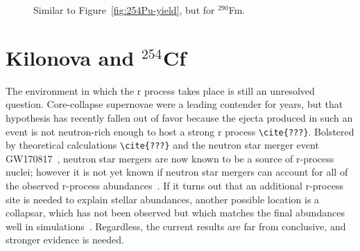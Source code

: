 \begin{figure}%
	\centering
	\qquad
	\caption{Similar to Figure~\ref{fig:254Pu-yield}, but for $^{290}$Fm.}%
	\label{fig:290Fm-yield}%
\end{figure}



\section{Kilonova and $^{254}$Cf}

The environment in which the r process takes place is still an unresolved question. Core-collapse supernovae were a leading contender for years, but that hypothesis has recently fallen out of favor because the ejecta produced in such an event is not neutron-rich enough to host a strong r process \verb|\cite{???}|. Bolstered by theoretical calculations \verb|\cite{???}| and the neutron star merger event GW170817~\cite{Abbott2017,Abbott2017a}, neutron star mergers are now known to be a source of r-process nuclei; however it is not yet known if neutron star mergers can account for all of the observed r-process abundances~\cite{Pian2017,Kasen2017}. If it turns out that an additional r-process site is needed to explain stellar abundances, another possible location is a collapsar, which has not been observed but which matches the final abundances well in simulations~\cite{Nakamura2013,Siegel2018}. Regardless, the current results are far from conclusive, and stronger evidence is needed.

